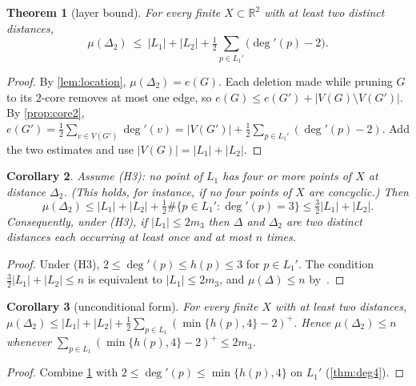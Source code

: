 \documentclass[11pt]{amsart}
\newtheorem{theorem}{Theorem}[section]
\newtheorem{corollary}[theorem]{Corollary}
\theoremstyle{definition}
\theoremstyle{remark}
\newcommand{\R}{\mathbb{R}}
\newcommand{\Dt}{\Delta_2}
\newcommand{\mult}{\mu}
\begin{document}
\begin{theorem}[layer bound]\label{thm:layer}
For every finite $X\subset\R^2$ with at least two distinct distances,
\[
\mult(\Dt)\ \le\ |L_1|+|L_2|+\tfrac12\sum_{p\in L_1'}\bigl(\deg'(p)-2\bigr).
\]
\end{theorem}
\begin{proof}
By \cref{lem:location}, $\mult(\Dt)=e(G)$. Each deletion made while pruning $G$ to its $2$-core removes at most one edge, so $e(G)\le e(G')+|V(G)\setminus V(G')|$. By \cref{prop:core2}, $e(G')=\frac12\sum_{v\in V(G')}\deg'(v)=|V(G')|+\frac12\sum_{p\in L_1'}(\deg'(p)-2)$. Add the two estimates and use $|V(G)|=|L_1|+|L_2|$.
\end{proof}

\begin{corollary}\label{cor:A1}
Assume \textup{(H3)}: no point of $L_1$ has four or more points of $X$ at distance $\Dt$. (This holds, for instance, if no four points of $X$ are concyclic.) Then
\[
\mult(\Dt)\le|L_1|+|L_2|+\tfrac12\#\{p\in L_1':\deg'(p)=3\}\le\tfrac32|L_1|+|L_2|.
\]
Consequently, under \textup{(H3)}, if $|L_1|\le2m_3$ then $\Delta$ and $\Dt$ are two distinct distances each occurring at least once and at most $n$ times.
\end{corollary}
\begin{proof}
Under (H3), $2\le\deg'(p)\le h(p)\le3$ for $p\in L_1'$. The condition $\frac32|L_1|+|L_2|\le n$ is equivalent to $|L_1|\le2m_3$, and $\mult(\Delta)\le n$ by~\cite{HP34}.
\end{proof}

\begin{corollary}[unconditional form]\label{cor:uncond}
For every finite $X$ with at least two distances,
$\mult(\Dt)\le|L_1|+|L_2|+\frac12\sum_{p\in L_1}(\min\{h(p),4\}-2)^+$. Hence $\mult(\Dt)\le n$ whenever $\sum_{p\in L_1}(\min\{h(p),4\}-2)^+\le2m_3$.
\end{corollary}
\begin{proof}
Combine \cref{thm:layer} with $2\le\deg'(p)\le\min\{h(p),4\}$ on $L_1'$ (\cref{thm:deg4}).
\end{proof}
\end{document}

